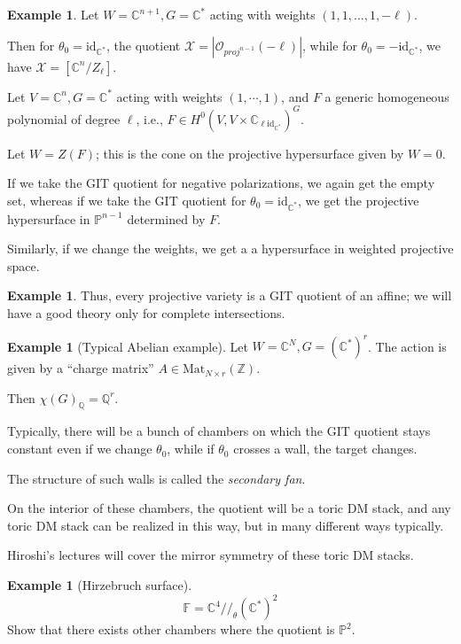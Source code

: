 \documentclass{amsart}
\theoremstyle{definition}
\newtheorem{example}[dummy]{Example}
\newcommand{\Z}{\mathbb{Z}}
\newcommand{\GIT}{//}
\newcommand{\X}{\mathcal{X}}
\newcommand{\OO}{\mathcal{O}}
\newcommand{\proj}{\mathbb{P}}
\newcommand{\Q}{\mathbb{Q}}
\newcommand{\C}{\mathbb{C}}
\begin{document}
\begin{example}
Let $W=\C^{n+1}, G=\C^*$ acting with weights $(1,1,\dots,1,-\ell)$.

Then for $\theta_0=\text{id}_{\C^*}$, the quotient $\X=|\OO_{proj^{n-1}}(-\ell)|$, while for $\theta_0=-\text{id}_{\C^*}$, we have $\X=[\C^n/Z_\ell]$.
\end{example}
Let $V=\C^n, G=\C^*$ acting with weights $(1,\cdots, 1)$, and $F$ a generic homogeneous polynomial of degree $\ell$, i.e., $F\in H^0(V, V\times \C_{\ell\text{id}_{\C^*}})^G$.

Let $W=Z(F)$; this is the cone on the projective hypersurface given by $W=0$.

If we take the GIT quotient for negative polarizations, we again get the empty set, whereas if we take the GIT quotient for $\theta_0=\text{id}_{\C^*}$, we get the projective hypersurface in $\proj^{n-1}$ determined by $F$.

Similarly, if we change the weights, we get a a hypersurface in weighted projective space.
\begin{example}

Thus, every projective variety is a GIT quotient of an affine; we will have a good theory only for complete intersections.

\end{example}



\begin{example}[Typical Abelian example]

Let $W=\C^N, G=(\C^*)^r$.  The action is given by a ``charge matrix'' $A\in\text{Mat}_{N\times r}(\Z)$.

Then $\chi(G)_\Q=\Q^r$.

Typically, there will be a bunch of chambers on which the GIT quotient stays constant even if we change $\theta_0$, while if $\theta_0$ crosses a wall, the target changes.

The structure of such walls is called the \emph{secondary fan}.

On the interior of these chambers, the quotient will be a toric DM stack, and any toric DM stack can be realized in this way, but in many different ways typically.

Hiroshi's lectures will cover the mirror symmetry of these toric DM stacks.
\end{example}

\begin{example}[Hirzebruch surface]
$$\mathbb{F}=\C^4\GIT_{\theta} (\C^*)^2$$
Show that there exists other chambers where the quotient is $\proj^2$.
\end{example}
\end{document}
